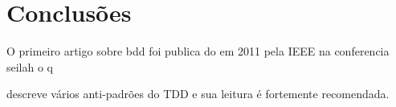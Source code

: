\chapter{Conclusões} %
\label{cha:conclusoes}

O primeiro artigo sobre bdd foi publica do em 2011 pela IEEE na conferencia seilah o q \cite{BDDSolis}

 descreve vários anti-padrões do TDD e sua leitura é fortemente recomendada.

